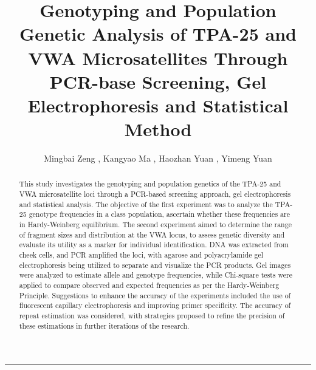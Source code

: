 \documentclass[a4paper,10pt]{article}
\title{Genotyping and Population Genetic Analysis of TPA-25 and VWA Microsatellites Through PCR-base Screening, Gel Electrophoresis and Statistical Method}
\author{Mingbai Zeng , Kangyao Ma , Haozhan Yuan , Yimeng Yuan}
\date{}
\begin{document}
\maketitle

\setlength{\absleftindent}{0pt}
\setlength{\absrightindent}{0pt}
\setlength{\abstitleskip}{-1.5em}
\abslabeldelim{:}
\renewcommand{\absnamepos}{flushleft}
\begin{abstract}
This study investigates the genotyping and population genetics of the TPA-25 and VWA microsatellite loci through a PCR-based screening approach, gel electrophoresis and statistical analysis. The objective of the first experiment was to analyze the TPA-25 genotype frequencies in a class population, ascertain whether these frequencies are in Hardy-Weinberg equilibrium. The second experiment aimed to determine the range of fragment sizes and distribution at the VWA locus, to assess genetic diversity and evaluate its utility as a marker for individual identification. DNA was extracted from cheek cells, and PCR amplified the loci, with agarose and polyacrylamide gel electrophoresis being utilized to separate and visualize the PCR products. Gel images were analyzed to estimate allele and genotype frequencies, while Chi-square tests were applied to compare observed and expected frequencies as per the Hardy-Weinberg Principle. Suggestions to enhance the accuracy of the experiments included the use of fluorescent capillary electrophoresis and improving primer specificity. The accuracy of repeat estimation was considered, with strategies proposed to refine the precision of these estimations in further iterations of the research.

\end{abstract}
\hrule
\end{document}
